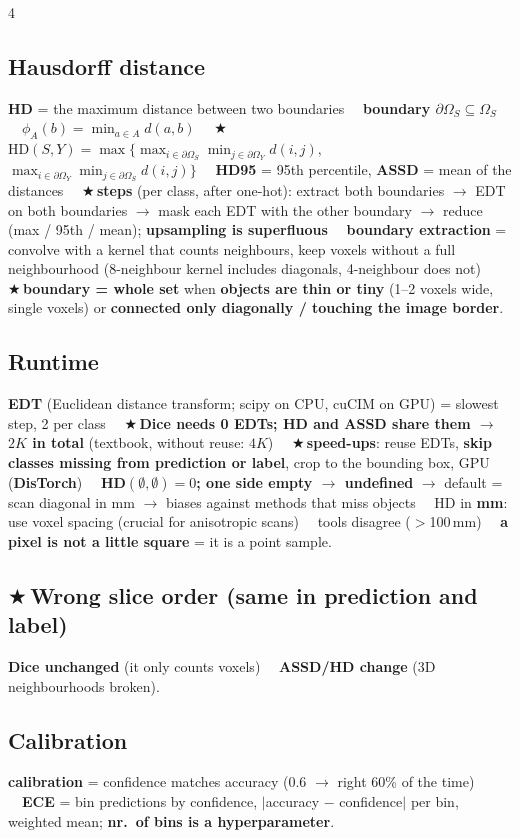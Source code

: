 \documentclass[a4paper]{article}
\newcommand{\K}[1]{\textcolor{kg}{\textbf{#1}}}
\newcommand{\F}[1]{\textcolor{fb}{#1}}
\newcommand{\E}[1]{\textcolor{ep}{#1}}
\newcommand{\T}[1]{\textcolor{tr}{\textbf{#1}}}
\newcommand{\X}{\textcolor{tr}{$\bigstar$}\,}
\newcommand{\D}{\unskip\ \textbf{\textbullet}\ \ignorespaces}
\newcommand{\ra}{\ensuremath{\to}}
\newcommand{\Om}{\Omega}
\begin{document}
\begin{multicols*}{4}
\subsection{Hausdorff distance}
\K{HD} = the maximum distance between two boundaries \D \K{boundary $\partial\Om_S\subseteq\Om_S$} \D \F{$\phi_A(b)=\min_{a\in A}d(a,b)$} \D \X\F{$\text{HD}(S,Y)=\max\big\{\max_{i\in\partial\Om_S}\min_{j\in\partial\Om_Y}d(i,j),$ $\max_{i\in\partial\Om_Y}\min_{j\in\partial\Om_S}d(i,j)\big\}$} \D \K{HD95} = 95th percentile, \K{ASSD} = mean of the distances \D \X\K{steps} (per class, after one-hot): extract both boundaries \ra{} EDT on both boundaries \ra{} mask each EDT with the other boundary \ra{} reduce (max / 95th / mean); \T{upsampling is superfluous} \D \K{boundary extraction} = convolve with a kernel that counts neighbours, keep voxels without a full neighbourhood (8-neighbour kernel includes diagonals, 4-neighbour does not) \D \X\K{boundary = whole set} when \T{objects are thin or tiny} (1--2 voxels wide, single voxels) or \T{connected only diagonally / touching the image border}.

\subsection{Runtime}
\K{EDT} (Euclidean distance transform; scipy on CPU, cuCIM on GPU) = slowest step, 2 per class \D \X\T{Dice needs 0 EDTs; HD and ASSD share them \ra{} $2K$ in total} (textbook, without reuse: $4K$) \D \X\K{speed-ups}: reuse EDTs, \T{skip classes missing from prediction or label}, crop to the bounding box, GPU (\K{DisTorch}) \D \T{HD$(\emptyset,\emptyset)=0$; one side empty \ra{} undefined} \ra{} default = scan diagonal in mm \ra{} biases against methods that miss objects \D HD in \K{mm}: use voxel spacing (crucial for anisotropic scans) \D tools disagree (\E{$>$100\,mm}) \D \K{a pixel is not a little square} = it is a point sample.

\subsection{\X Wrong slice order (same in prediction and label)}
\T{Dice unchanged} (it only counts voxels) \D \T{ASSD/HD change} (3D neighbourhoods broken).

\subsection{Calibration}
\K{calibration} = confidence matches accuracy (\E{0.6 \ra{} right 60\% of the time}) \D \K{ECE} = bin predictions by confidence, $|$accuracy $-$ confidence$|$ per bin, weighted mean; \T{nr.\ of bins is a hyperparameter}.


\end{multicols*}
\end{document}
